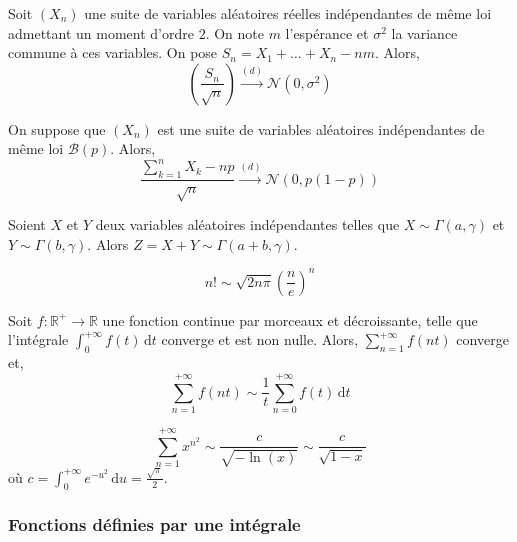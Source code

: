 
  \begin{theorem}
    Soit $(X_n)$ une suite de variables aléatoires réelles indépendantes de même loi admettant un moment d'ordre $2$. On note $m$ l'espérance et $\sigma^2$ la variance commune à ces variables. On pose $S_n = X_1 + \dots + X_n - nm$. Alors,
    \[ \left ( \frac{S_n}{\sqrt{n}} \right) \overset{(d)}{\longrightarrow} \mathcal{N}(0, \sigma^2) \]
  \end{theorem}

  \begin{application}
    On suppose que $(X_n)$ est une suite de variables aléatoires indépendantes de même loi $\mathcal{B}(p)$. Alors,
    \[ \frac{\sum_{k=1}^{n} X_k - np}{\sqrt{n}} \overset{(d)}{\longrightarrow} \mathcal{N}(0, p(1-p)) \]
  \end{application}


  \begin{lemma}
    Soient $X$ et $Y$ deux variables aléatoires indépendantes telles que $X \sim \Gamma(a, \gamma)$ et $Y \sim \Gamma(b, \gamma)$. Alors $Z = X + Y \sim \Gamma(a+b, \gamma)$.
  \end{lemma}


  \begin{application}
    \[ n! \sim \sqrt{2n\pi} \left(\frac{n}{e} \right)^n \]
  \end{application}


  \begin{proposition}
    Soit $f : \mathbb{R}^+ \rightarrow \mathbb{R}$ une fonction continue par morceaux et décroissante, telle que l'intégrale $\int_0^{+\infty} f(t) \, \mathrm{d}t$ converge et est non nulle. Alors, $\sum_{n=1}^{+\infty} f(nt)$ converge et,
    \[ \sum_{n=1}^{+\infty} f(nt) \sim \frac{1}{t} \sum_{n=0}^{+\infty} f(t) \, \mathrm{d}t \]
  \end{proposition}

  \begin{example}
    \[ \sum_{n=1}^{+\infty} x^{n^2} \sim \frac{c}{\sqrt{-\ln(x)}} \sim \frac{c}{\sqrt{1-x}} \]
    où $c = \int_0^{+\infty} e^{-u^2} \, \mathrm{d}u = \frac{\sqrt{\pi}}{2}$.
  \end{example}

  \subsubsection{Fonctions définies par une intégrale}

